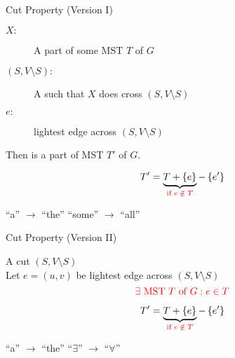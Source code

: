 
\begin{frame}{}
  \centerline{}
\end{frame}

\begin{frame}{}
  \begin{exampleblock}{Cut Property (Version I)}
    \begin{description}
      \item[$X:$] A part of some MST $T$ of $G$
      \item[$(S, V \setminus S):$] A  such that $X$ does  cross $(S, V \setminus S)$
    ­ \item[$e:$]  lightest edge across $(S, V \setminus S)$
    \end{description}

    \pause
    \vspace{0.30cm}
    \centerline{Then  is a part of  MST $T'$ of $G$.}
  \end{exampleblock}

  \pause
  \vspace{0.60cm}
  \centerline{}
\end{frame}

\begin{frame}{}
  \centerline{}

  \pause
  \vspace{0.30cm}

  \pause
  \[
    T' = \underbrace{T + \left\{e\right\}}_{\textcolor{red}{\text{if } e \;\notin\; T}} - \left\{e'\right\}
  \]

  \pause
  \centerline{``a'' $\to$ ``the'' \red{$\implies$} ``some'' $\to$ ``all''}
\end{frame}

\begin{frame}{}
  \begin{exampleblock}{Cut Property (Version II)}
    \begin{center}
      A cut $(S, V \setminus S)$ \\[6pt]
      Let $e = (u,v)$ be  lightest edge across $(S, V \setminus S)$
      \[
	\textcolor{red}{\exists \text{ MST $T$ of } G: e \in T}
      \]
    \end{center}
  \end{exampleblock}


  \pause
  \vspace{-0.50cm}
  \[
    T' = \underbrace{T + \left\{e\right\}}_{\textcolor{red}{\text{if } e \;\notin\; T}} - \left\{e'\right\}
  \]
  
  \pause
  \centerline{``a'' $\to$ ``the'' \red{$\implies$} ``$\exists$'' $\to$ ``$\forall$''}
\end{frame}

